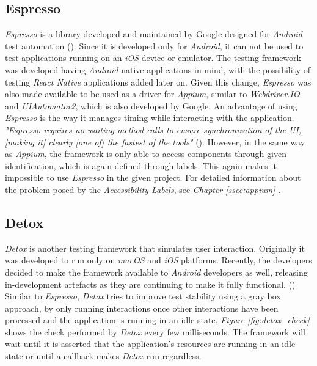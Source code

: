 \subsection{Espresso}
\label{ssec:espresso}

\textit{Espresso} is a library developed and maintained by Google designed for \textit{Android} test automation (\cite{appium-pro}). Since it is developed only for \textit{Android}, it can not be used to test applications running on an \textit{iOS} device or emulator.
\newline
The testing framework was developed having \textit{Android} native applications in mind, with the possibility of testing \textit{React Native} applications added later on. Given this change, \textit{Espresso} was also made available to be used as a driver for \textit{Appium}, similar to \textit{Webdriver.IO} and \textit{UIAutomator2}, which is also developed by Google.
\newline
An advantage of using \textit{Espresso} is the way it manages timing while interacting with the application. \textit{"Espresso requires no waiting method calls to ensure synchronization of the UI, [making it] clearly [one of] the fastest of the tools"} (\cite{comparison-gui}).
\newline
However, in the same way as \textit{Appium}, the framework is only able to access components through given identification, which is again defined through labels. This again makes it impossible to use \textit{Espresso} in the given project. For detailed information about the problem posed by the \textit{Accessibility Labels}, see \textit{Chapter \ref{ssec:appium} }.

\subsection{Detox}
\label{ssec:detox}

\textit{Detox} is another testing framework that simulates user interaction. Originally it was developed to run only on \textit{macOS} and \textit{iOS} platforms. Recently, the developers decided to make the framework available to \textit{Android} developers as well, releasing in-development artefacts as they are continuing to make it fully functional. (\cite{android-status})
\newline
Similar to \textit{Espresso}, \textit{Detox} tries to improve test stability using a gray box approach, by only running interactions once other interactions have been processed and the application is running in an idle state. \textit{Figure \ref{fig:detox_check}} shows the check performed by \textit{Detox} every few milliseconds. The framework will wait until it is asserted that the application's resources are running in an idle state or until a callback makes \textit{Detox} run regardless.

